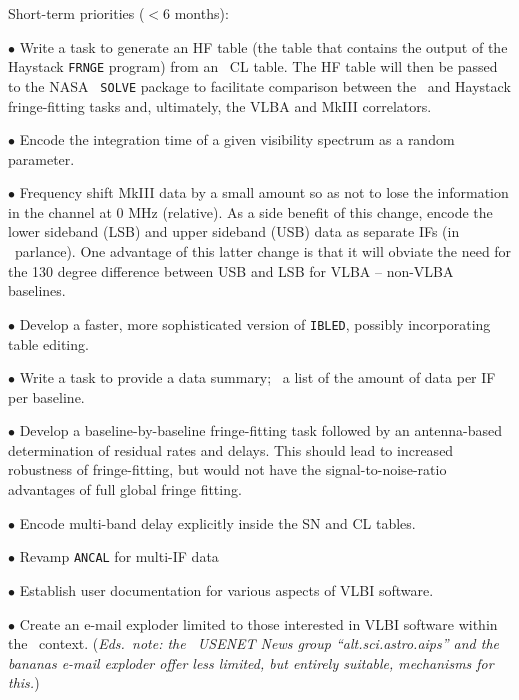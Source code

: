 Short-term priorities ($< 6$ months):
\begin{description}
\item{$\bullet$} Write a task to generate an HF table (the table that
contains the output of the Haystack {\tt FRNGE} program) from an
\AIPS\ CL table.  The HF table will then be passed to the NASA {\tt
SOLVE}  package to facilitate comparison between the \AIPS\ and
Haystack fringe-fitting tasks and, ultimately, the VLBA and MkIII
correlators.

\item{$\bullet$} Encode the integration time of a given visibility
spectrum as a random parameter.

\item{$\bullet$} Frequency shift MkIII data by a small amount so as
not to lose the information in the channel at 0 MHz (relative). As a
side benefit of this change, encode the lower sideband (LSB) and upper
sideband (USB) data as separate IFs (in \AIPS\ parlance).  One
advantage of this latter change is that it will obviate the need for
the 130 degree difference between USB and LSB for VLBA -- non-VLBA
baselines.

\item{$\bullet$} Develop a faster, more sophisticated version of
{\tt IBLED}, possibly incorporating table editing.

\item{$\bullet$} Write a task to provide a data summary; \ie\ a list
of the amount of data per IF per baseline.

\item{$\bullet$} Develop a baseline-by-baseline fringe-fitting task
followed by an antenna-based determination of residual rates and
delays.  This should lead to increased robustness of fringe-fitting,
but would not have the signal-to-noise-ratio advantages of full global
fringe fitting.

\item{$\bullet$} Encode multi-band delay explicitly inside the SN and
CL tables.

\item{$\bullet$} Revamp {\tt ANCAL} for multi-IF data

\item{$\bullet$} Establish user documentation for various aspects of
VLBI software.

\item{$\bullet$} Create an e-mail exploder limited to those interested
in VLBI software within the \AIPS\ context.  ({\it Eds.~note: the
\AIPS\ USENET News group ``alt.sci.astro.aips'' and the bananas e-mail
exploder offer less limited, but entirely suitable, mechanisms for
this.})
\end{description}

